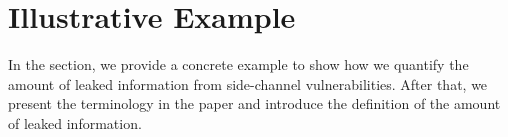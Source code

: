 \section{Illustrative Example}
In the section, we provide a concrete example to show how we 
quantify the amount of leaked information from side-channel
vulnerabilities. After that, we present the terminology in the
paper and introduce the definition of the amount of 
leaked information.


